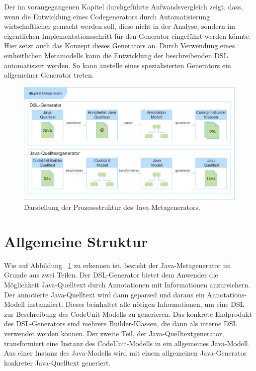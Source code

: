 \documentclass[12pt,oneside,a4paper,parskip]{scrbook}
\begin{document}
Der im vorangegangenen Kapitel durchgeführte Aufwandsvergleich zeigt, dass, wenn die Entwicklung eines Codegenerators durch Automatisierung wirtschaftlicher gemacht werden soll, diese nicht in der Analyse, sondern im eigentlichen Implementationsschritt für den Generator eingeführt werden könnte. Hier setzt auch das Konzept dieses Generators an. Durch Verwendung eines einheitlichen Metamodells kann die Entwicklung der beschreibenden DSL automatisiert werden. So kann anstelle eines spezialisierten Generators ein allgemeiner Generator treten.

\begin{figure}[h]
	\centering
	\includegraphics[width=1.0\textwidth]{bilder/metagenProzess}
	\caption{Darstellung der Prozessstruktur des Java-Metagenerators.}
	\label{fig:meta1}
\end{figure}

\section{Allgemeine Struktur}

Wie auf Abbildung ~\ref{fig:meta1} zu erkennen ist, besteht der Java-Metagenerator im Grunde aus zwei Teilen. Der DSL-Generator bietet dem Anwender die Möglichkeit Java-Quelltext durch Annotationen mit Informationen anzureichern. Der annotierte Java-Quelltext wird dann geparsed und daraus ein Annotations-Modell instanziiert. Dieses beinhaltet alle nötigen Informationen, um eine DSL zur Beschreibung des CodeUnit-Modells zu generieren. Das konkrete Endprodukt des DSL-Generators sind mehrere Builder-Klassen, die dann als interne DSL verwendet werden können. Der zweite Teil, der Java-Quelltextgenerator, transformiert eine Instanz des CodeUnit-Modells in ein allgemeines Java-Modell. Aus einer Instanz des Java-Modells wird mit einem allgemeinen Java-Generator konkreter Java-Quelltext generiert.
\end{document}
